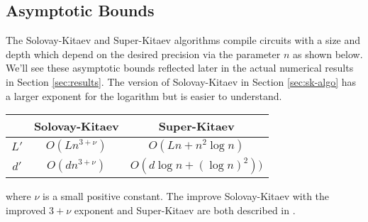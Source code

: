 \subsection{Asymptotic Bounds}

The Solovay-Kitaev and Super-Kitaev algorithms compile circuits with
a size and depth which depend on the desired precision via the
parameter $n$ as shown below. We'll see these asymptotic bounds reflected
later in the actual numerical results in Section \ref{sec:results}.
The version of Solovay-Kitaev in Section \ref{sec:sk-algo} has a
larger exponent for the logarithm but is
easier to understand.

\begin{center}
\begin{table}
\begin{tabular}{|c|c|c|}
\hline
   & Solovay-Kitaev & Super-Kitaev\\
\hline
$L'$ & $O(Ln^{3+\nu})$ & $O(Ln + n^2 \log n)$\\
$d'$ & $O(dn^{3+\nu})$ & $O(d \log{n} + (\log{n})^2))$\\ 
\hline
\end{tabular}
\end{table}
\end{center}

where $\nu$ is a small positive constant.
The improve Solovay-Kitaev with the improved $3+\nu$ exponent and
Super-Kitaev are both described in \cite{ksv02}.